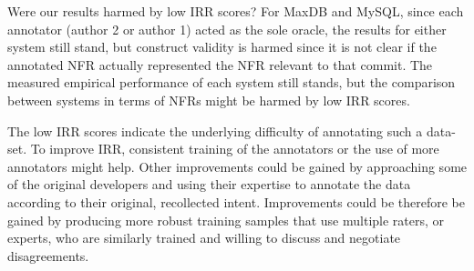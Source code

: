 \documentclass[smallextended]{svjour3}       %
\begin{document}
Were our results harmed by low IRR scores? For MaxDB and MySQL, since
each annotator (author 2 or author 1) acted as the sole oracle, the results
for either system still stand, but construct validity is harmed since 
it is not clear if the annotated NFR actually represented the NFR relevant to that commit.
 The measured empirical performance of each system still
stands, but the comparison between systems in terms of NFRs might be
harmed by low IRR scores.

The low IRR scores indicate
the underlying difficulty of annotating such a data-set. To improve IRR,
consistent training of the annotators or the use of more annotators might help.
Other improvements could be gained by approaching some of the original developers
and using their expertise to annotate the data according to their original, recollected intent.
Improvements
could be therefore be gained by producing more robust training samples that use
multiple raters, or experts, who are similarly trained and willing to discuss and
negotiate disagreements.






\end{document}
